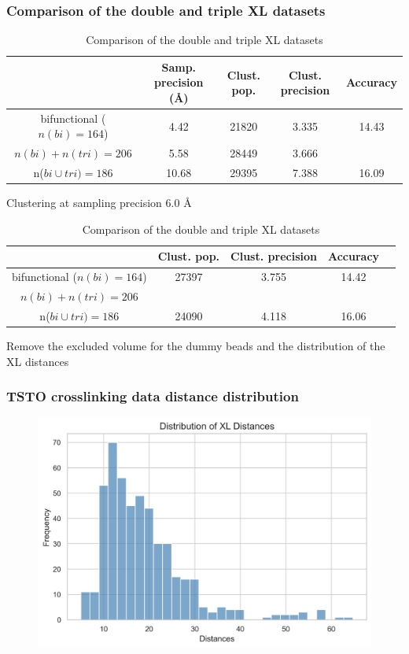 \documentclass[a4paper,8pt]{beamer}
\begin{document}
%
\begin{frame}
\frametitle{Comparison of the double and triple XL datasets}
\begin{table}
  \centering
  \caption{Comparison of the double and triple XL datasets}
  \begin{tabular}{|c|c|c|c|c|}
      \hline
                                   & Samp. precision ({\AA}) & Clust. pop. & Clust. precision & Accuracy\\ \hline
      bifunctional ($n(bi) = 164$) & 4.42  & 21820 & 3.335 & 14.43 \\\hline
      $n(bi) + n(tri) = 206$       & 5.58  & 28449 & 3.666 & \\ \hline
      n($bi \cup tri) = 186$       & 10.68 & 29395 & 7.388 &  16.09 \\\hline
  \end{tabular}
\end{table}
Clustering at sampling precision $6.0$ {\AA}
\begin{table}
  \centering
  \caption{Comparison of the double and triple XL datasets}
  \begin{tabular}{|c|c|c|c|c|}
      \hline
                                   & Clust. pop. & Clust. precision & Accuracy\\ \hline
      bifunctional ($n(bi) = 164$) & 27397 & 3.755 & 14.42\\ \hline
      $n(bi) + n(tri) = 206$       &  &  & \\ \hline
      n($bi \cup tri) = 186$       & 24090 & 4.118 & 16.06\\ \hline
  \end{tabular}
\end{table}
\begin{block}{}
  Remove the excluded volume for the dummy beads and the distribution of the XL distances 
\end{block}
\end{frame}
%
\begin{frame}
  \frametitle{TSTO crosslinking data distance distribution}
  \begin{figure}
    \centering
    \includegraphics[scale=0.5]{test-figures/distance_histogram.png}
  \end{figure}
  \end{frame}
\end{document}
